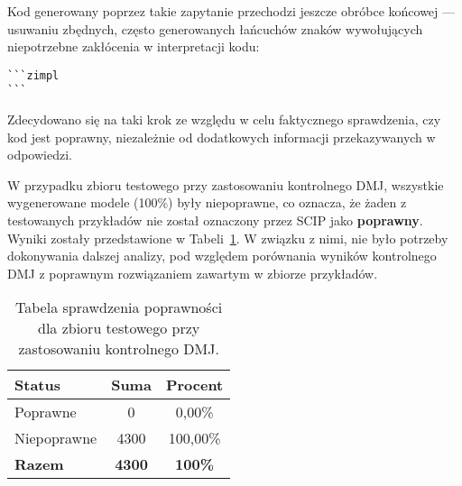 Kod generowany poprzez takie zapytanie przechodzi jeszcze obróbce końcowej --- usuwaniu zbędnych, często generowanych łańcuchów znaków wywołujących niepotrzebne zakłócenia w interpretacji kodu:
\begin{lstlisting}[language=zimpl]
```zimpl
```
\end{lstlisting}

Zdecydowano się na taki krok ze względu w celu faktycznego sprawdzenia, czy kod jest poprawny, niezależnie od dodatkowych informacji przekazywanych w odpowiedzi.


W przypadku zbioru testowego przy zastosowaniu kontrolnego DMJ, wszystkie wygenerowane modele (100\%) były niepoprawne, co oznacza, że żaden z testowanych przykładów nie został oznaczony przez SCIP jako \textbf{poprawny}. Wyniki zostały przedstawione w Tabeli~\ref{tab:tabela10}. W związku z nimi, nie było potrzeby dokonywania dalszej analizy, pod względem porównania wyników kontrolnego DMJ z poprawnym rozwiązaniem zawartym w zbiorze przykładów.

\begin{table}[H]
\caption{Tabela sprawdzenia poprawności dla zbioru testowego przy zastosowaniu kontrolnego DMJ.}\label{tab:tabela10}
\centering%
\begin{tabular}{|l|c|c|}
\hline
\textbf{Status} & \textbf{Suma} & \textbf{Procent} \\
\hline
Poprawne & 0 & 0,00\% \\
\hline
Niepoprawne & 4300 & 100,00\% \\
\hline
\textbf{Razem} & \textbf{4300} & \textbf{100\%} \\
\hline
\end{tabular}
\end{table}

